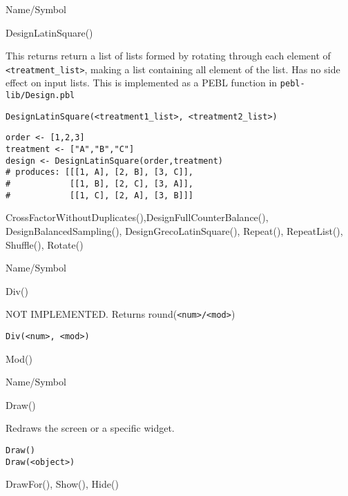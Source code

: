 \rl


\begin{desc}{Name/Symbol}
\item[Name/Symbol]	DesignLatinSquare()

\item[Description]	This returns return a list of lists formed by rotating 
 		through each element of \verb+<treatment_list>+, making a list
 		containing all element of the list. Has no side effect
  		on input lists.
		This is implemented as a PEBL function in \texttt{pebl-lib/Design.pbl}

\item[Usage]
\begin{verbatim}
DesignLatinSquare(<treatment1_list>, <treatment2_list>)
\end{verbatim}

\item[Example]
\begin{verbatim}
order <- [1,2,3]
treatment <- ["A","B","C"]
design <- DesignLatinSquare(order,treatment)
# produces: [[[1, A], [2, B], [3, C]],
#            [[1, B], [2, C], [3, A]],
#            [[1, C], [2, A], [3, B]]]
\end{verbatim}

\item[See Also]	CrossFactorWithoutDuplicates(),DesignFullCounterBalance(), 
 		DesignBalancedSampling(),  DesignGrecoLatinSquare(),  
		Repeat(), RepeatList(), Shuffle(), Rotate()
\end{desc}

\rl


\begin{desc}{Name/Symbol}
\item[Name/Symbol]	Div()

\item[Description]  	NOT IMPLEMENTED.  Returns round(\verb+<num>/<mod>+)

\item[Usage]
\begin{verbatim}
Div(<num>, <mod>)
\end{verbatim}

\item[Example]	

\item[See Also]	Mod()
\end{desc}

\rl




\begin{desc}{Name/Symbol}
\item[Name/Symbol]	Draw()

\item[Description]	Redraws the screen or a specific widget.

\item[Usage]
\begin{verbatim}
Draw()
Draw(<object>)
\end{verbatim}

\item[Example]	

\item[See Also]	DrawFor(), Show(), Hide()
\end{desc}


